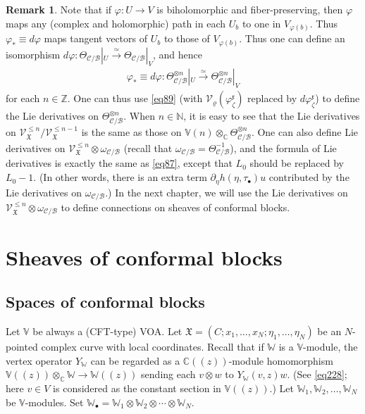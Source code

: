 \documentclass[12pt,a4paper,notitlepage]{report}
\theoremstyle{definition}
\newtheorem{rem}[df]{Remark}
\theoremstyle{plain}
\newcommand{\fk}{\mathfrak}
\newcommand{\mc}{\mathcal}
\newcommand{\scr}{\mathscr}
\newcommand{\blt}{\bullet}
\newcommand{\Vbb}{\mathbb V}
\newcommand{\Wbb}{\mathbb W}
\newcommand{\Cbb}{\mathbb C}
\newcommand{\Nbb}{\mathbb N}
\newcommand{\Zbb}{\mathbb Z}
\numberwithin{equation}{section}
\begin{document}
\begin{rem}\label{lb54}
Note that if $\varphi:U\rightarrow V$  is biholomorphic and fiber-preserving, then $\varphi$ maps any (complex and holomorphic) path in each $U_b$ to one in $V_{\varphi(b)}$. Thus $\varphi_*\equiv d\varphi$ maps tangent vectors of $U_b$ to those of $V_{\varphi(b)}$. Thus one can define an isomorphism  $d\varphi:\Theta_{\mc C/\mc B}|_U\xrightarrow{\simeq}\Theta_{\mc C/\mc B}|_V$, and hence 
\begin{align*}
\varphi_*\equiv d\varphi:\Theta_{\mc C/\mc B}^{\otimes n}|_U\xrightarrow{\simeq}\Theta_{\mc C/\mc B}^{\otimes n}|_V
\end{align*}
for each $n\in\Zbb$. One can thus use \eqref{eq89} (with $\mc V_\varrho(\varphi_\zeta^{\fk x})$ replaced by $d\varphi_\zeta^{\fk x}$)  to define the Lie derivatives  on $\Theta_{\mc C/\mc B}^{\otimes n}$. When $n\in\Nbb$, it is easy to see that the Lie derivatives on $\scr V_{\fk X}^{\leq n}/\scr V_{\fk X}^{\leq n-1}$ is the same as those on $\Vbb(n)\otimes_{\Cbb}\Theta_{\mc C/\mc B}^{\otimes n}$. One can also define Lie derivatives on $\scr V_{\fk X}^{\leq n}\otimes\omega_{\mc C/\mc B}$ (recall that $\omega_{\mc C/\mc B}=\Theta_{\mc C/\mc B}^{-1}$), and the formula of Lie derivatives is exactly the same as \eqref{eq87}, except that  $L_0$ should be replaced by $L_0-1$. (In other words, there is an extra term $\partial_\eta h(\eta,\tau_\blt)u$ contributed by the Lie derivatives on $\omega_{\mc C/\mc B}$.) In the next chapter, we will use the Lie derivatives on $\scr V_{\fk X}^{\leq n}\otimes\omega_{\mc C/\mc B}$ to define connections on sheaves of conformal blocks.
\end{rem}











\chapter{Sheaves of conformal blocks}\label{lb91}





\section{Spaces of conformal blocks}\label{lb34}

Let $\Vbb$ be always a (CFT-type) VOA. Let $\fk X=(C;x_1,\dots,x_N;\eta_1,\dots,\eta_N)$ be an $N$-pointed complex curve with local coordinates. Recall that if $\Wbb$ is a $\Vbb$-module, the vertex operator $Y_\Wbb$ can be regarded as a $\Cbb((z))$-module homomorphism $\Vbb((z))\otimes_{\Cbb}\Wbb\rightarrow\Wbb((z))$ sending each $v\otimes w$ to $Y_{\Wbb}(v,z)w$. (See \eqref{eq228}; here $v\in V$ is considered as the constant section in $\Vbb((z))$.) Let $\Wbb_1,\Wbb_2,\dots,\Wbb_N$ be $\Vbb$-modules. Set \index{Ww@$\Wbb_\blt,w_\blt$} $\Wbb_\blt=\Wbb_1\otimes \Wbb_2\otimes\cdots\otimes \Wbb_N$.  
\end{document}

